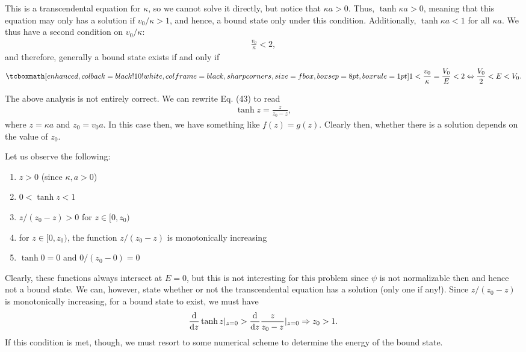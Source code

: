 {This is a transcendental equation for $\kappa$, so we cannot solve it directly, but notice that $\kappa a > 0$.
Thus, $\tanh{\kappa a} > 0$, meaning that this equation may only has a solution if $v_0/\kappa > 1$, and hence, a bound state only under this condition.
Additionally, $\tanh{\kappa a} < 1$ for all $\kappa a$.
We thus have a second condition on $v_0/\kappa$:
\begin{eqnarray}
    \frac{v_0}{\kappa} < 2
,\end{eqnarray}
and therefore, generally a bound state exists if and only if
\begin{eqnarray}
    \eqbox{ 1 < \frac{v_0}{\kappa} = \frac{V_0}{E} < 2 \Leftrightarrow \frac{V_0}{2} < E < V_0 }
.\end{eqnarray}

{

\color{red} The above analysis is not entirely correct.
We can rewrite Eq. (43) to read
\begin{eqnarray}
    \tanh{z} = \frac{z}{z_0 - z}
,\end{eqnarray}
where $z = \kappa a$ and $z_0 = v_0 a$.
In this case then, we have something like $f(z) = g(z)$.
Clearly then, whether there is a solution depends on the value of $z_0$.

Let us observe the following:
\begin{enumerate}
    \item $z > 0$ (since $\kappa,a > 0$)
    \item $0 < \tanh{z} < 1$
    \item $z/(z_0 - z) > 0$ for $z \in [0,z_0)$
    \item for $z \in [0,z_0)$, the function $z/(z_0-z)$ is monotonically increasing
    \item $\tanh{0} = 0$ and $0/(z_0-0) = 0$
\end{enumerate}

Clearly, these functions always intersect at $E = 0$, but this is not interesting for this problem since $\psi$ is not normalizable then and hence not a bound state.
We can, however, state whether or not the transcendental equation has a solution (only one if any!).
Since $z/(z_0-z)$ is monotonically increasing, for a bound state to exist, we must have
\begin{eqnarray}
    \dv{z} \tanh{z}|_{z = 0} > \dv{z} \frac{z}{z_0 - z} |_{z=0} \Rightarrow z_0 > 1
.\end{eqnarray}
If this condition is met, though, we must resort to some numerical scheme to determine the energy of the bound state.

}


}


